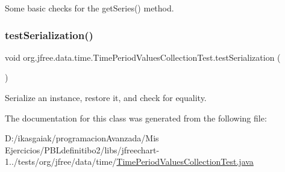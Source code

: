 Some basic checks for the get\+Series() method. \mbox{\label{classorg_1_1jfree_1_1data_1_1time_1_1_time_period_values_collection_test_ae8bd14f6b8004a7a6d73b0cd50b0493b}} 
\subsubsection{\texorpdfstring{test\+Serialization()}{testSerialization()}}
{\footnotesize\ttfamily void org.\+jfree.\+data.\+time.\+Time\+Period\+Values\+Collection\+Test.\+test\+Serialization (\begin{DoxyParamCaption}{ }\end{DoxyParamCaption})}

Serialize an instance, restore it, and check for equality. 

The documentation for this class was generated from the following file\+:\begin{DoxyCompactItemize}
\item 
D\+:/ikasgaiak/programacion\+Avanzada/\+Mis Ejercicios/\+P\+B\+Ldefinitibo2/libs/jfreechart-\/1../tests/org/jfree/data/time/\mbox{\hyperlink{_time_period_values_collection_test_8java}{Time\+Period\+Values\+Collection\+Test.\+java}}\end{DoxyCompactItemize}
